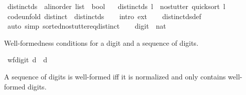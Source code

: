 \begin{isabellebody}
\ distinct{\isacharunderscore}{\kern0pt}ds\ {\isacharcolon}{\kern0pt}{\isacharcolon}{\kern0pt}\ {\isachardoublequoteopen}{\isacharprime}{\kern0pt}a{\isacharcolon}{\kern0pt}{\isacharcolon}{\kern0pt}linorder\ list\ {\isasymRightarrow}\ bool{\isachardoublequoteclose}\isanewline
\ \ \ {\isachardoublequoteopen}distinct{\isacharunderscore}{\kern0pt}ds\ l\ {\isasymequiv}\ no{\isacharunderscore}{\kern0pt}stutter\ {\isacharparenleft}{\kern0pt}quicksort\ l{\isacharparenright}{\kern0pt}{\isachardoublequoteclose}\isanewline
\isanewline
{}\isamarkupfalse%
\ {\isacharbrackleft}{\kern0pt}code{\isacharunderscore}{\kern0pt}unfold{\isacharbrackright}{\kern0pt}{\isacharcolon}{\kern0pt}\ {\isachardoublequoteopen}distinct\ {\isacharequal}{\kern0pt}\ distinct{\isacharunderscore}{\kern0pt}ds{\isachardoublequoteclose}\isanewline
%
\isadelimproof
\ \ %
\endisadelimproof
%
\isatagproof
{}\isamarkupfalse%
\ {\isacharparenleft}{\kern0pt}intro\ ext{\isacharparenright}{\kern0pt}\isanewline
\ \ \isamarkupfalse%
\ distinct{\isacharunderscore}{\kern0pt}ds{\isacharunderscore}{\kern0pt}def\isanewline
\ \ \isamarkupfalse%
\ {\isacharparenleft}{\kern0pt}auto\ simp{\isacharcolon}{\kern0pt}\ sorted{\isacharunderscore}{\kern0pt}no{\isacharunderscore}{\kern0pt}stutter{\isacharunderscore}{\kern0pt}eq{\isacharunderscore}{\kern0pt}distinct{\isacharparenright}{\kern0pt}\isanewline
\ \ \isamarkupfalse%
%
\endisatagproof
{\isafoldproof}%
%
\isadelimproof
%
\endisadelimproof
%
\isadelimdocument
%
\endisadelimdocument
%
\isatagdocument
%
\isamarkuptrue%
%
\endisatagdocument
{\isafolddocument}%
%
\isadelimdocument
%
\endisadelimdocument
{}\isamarkupfalse%
\ digit\ {\isacharequal}{\kern0pt}\ nat%
\begin{isamarkuptext}%
Well-formedness conditions for a digit and a sequence of digits.%
\end{isamarkuptext}\isamarkuptrue%
\isamarkupfalse%
\ {\isachardoublequoteopen}wf{\isacharunderscore}{\kern0pt}digit\ d\ {\isasymlongleftrightarrow}\ d\ {\isacharless}{\kern0pt}\ {}{}{\isachardoublequoteclose}%
\begin{isamarkuptext}%
A sequence of digits is well-formed iff it is normalized and only contains well-formed digits.%
\end{isamarkuptext}\isamarkuptrue%
\isamarkupfalse%

\end{isabellebody}
